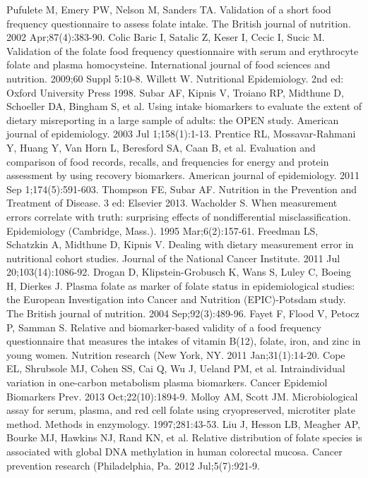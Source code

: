 \begin{thebibliography}{12}
		Pufulete M, Emery PW, Nelson M, Sanders TA. Validation of a short food frequency questionnaire to assess folate intake. The British journal of nutrition. 2002 Apr;87(4):383-90.
		Colic Baric I, Satalic Z, Keser I, Cecic I, Sucic M. Validation of the folate food frequency questionnaire with serum and erythrocyte folate and plasma homocysteine. International journal of food sciences and nutrition. 2009;60 Suppl 5:10-8.
		Willett W. Nutritional Epidemiology. 2nd ed: Oxford University Press 1998.
		Subar AF, Kipnis V, Troiano RP, Midthune D, Schoeller DA, Bingham S, et al. Using intake biomarkers to evaluate the extent of dietary misreporting in a large sample of adults: the OPEN study. American journal of epidemiology. 2003 Jul 1;158(1):1-13.
		Prentice RL, Mossavar-Rahmani Y, Huang Y, Van Horn L, Beresford SA, Caan B, et al. Evaluation and comparison of food records, recalls, and frequencies for energy and protein assessment by using recovery biomarkers. American journal of epidemiology. 2011 Sep 1;174(5):591-603.
		Thompson FE, Subar AF. Nutrition in the Prevention and Treatment of Disease. 3 ed: Elsevier 2013.
		Wacholder S. When measurement errors correlate with truth: surprising effects of nondifferential misclassification. Epidemiology (Cambridge, Mass.). 1995 Mar;6(2):157-61.
		Freedman LS, Schatzkin A, Midthune D, Kipnis V. Dealing with dietary measurement error in nutritional cohort studies. Journal of the National Cancer Institute. 2011 Jul 20;103(14):1086-92.
		Drogan D, Klipstein-Grobusch K, Wans S, Luley C, Boeing H, Dierkes J. Plasma folate as marker of folate status in epidemiological studies: the European Investigation into Cancer and Nutrition (EPIC)-Potsdam study. The British journal of nutrition. 2004 Sep;92(3):489-96.
		Fayet F, Flood V, Petocz P, Samman S. Relative and biomarker-based validity of a food frequency questionnaire that measures the intakes of vitamin B(12), folate, iron, and zinc in young women. Nutrition research (New York, NY. 2011 Jan;31(1):14-20.
		Cope EL, Shrubsole MJ, Cohen SS, Cai Q, Wu J, Ueland PM, et al. Intraindividual variation in one-carbon metabolism plasma biomarkers. Cancer Epidemiol Biomarkers Prev. 2013 Oct;22(10):1894-9.
		Molloy AM, Scott JM. Microbiological assay for serum, plasma, and red cell folate using cryopreserved, microtiter plate method. Methods in enzymology. 1997;281:43-53.
		Liu J, Hesson LB, Meagher AP, Bourke MJ, Hawkins NJ, Rand KN, et al. Relative distribution of folate species is associated with global DNA methylation in human colorectal mucosa. Cancer prevention research (Philadelphia, Pa. 2012 Jul;5(7):921-9.

\end{thebibliography}
